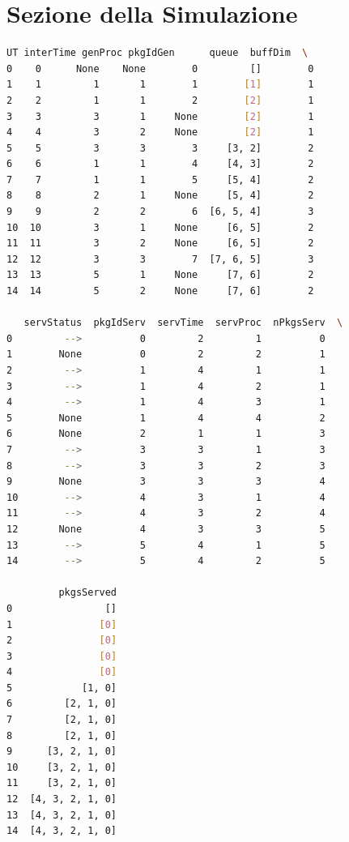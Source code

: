 \documentclass[12pt,a4paper]{article}
\begin{document}
\section{Sezione della Simulazione}
\begin{lstlisting}[language=bash, caption=System Section]
    UT interTime genProc pkgIdGen      queue  buffDim  \
0    0      None    None        0         []        0   
1    1         1       1        1        [1]        1   
2    2         1       1        2        [2]        1   
3    3         3       1     None        [2]        1   
4    4         3       2     None        [2]        1   
5    5         3       3        3     [3, 2]        2   
6    6         1       1        4     [4, 3]        2   
7    7         1       1        5     [5, 4]        2   
8    8         2       1     None     [5, 4]        2   
9    9         2       2        6  [6, 5, 4]        3   
10  10         3       1     None     [6, 5]        2   
11  11         3       2     None     [6, 5]        2   
12  12         3       3        7  [7, 6, 5]        3   
13  13         5       1     None     [7, 6]        2   
14  14         5       2     None     [7, 6]        2   

   servStatus  pkgIdServ  servTime  servProc  nPkgsServ  \
0         -->          0         2         1          0   
1        None          0         2         2          1   
2         -->          1         4         1          1   
3         -->          1         4         2          1   
4         -->          1         4         3          1   
5        None          1         4         4          2   
6        None          2         1         1          3   
7         -->          3         3         1          3   
8         -->          3         3         2          3   
9        None          3         3         3          4   
10        -->          4         3         1          4   
11        -->          4         3         2          4   
12       None          4         3         3          5   
13        -->          5         4         1          5   
14        -->          5         4         2          5   

         pkgsServed  
0                []  
1               [0]  
2               [0]  
3               [0]  
4               [0]  
5            [1, 0]  
6         [2, 1, 0]  
7         [2, 1, 0]  
8         [2, 1, 0]  
9      [3, 2, 1, 0]  
10     [3, 2, 1, 0]  
11     [3, 2, 1, 0]  
12  [4, 3, 2, 1, 0]  
13  [4, 3, 2, 1, 0]  
14  [4, 3, 2, 1, 0]  
\end{lstlisting}
\end{document}
